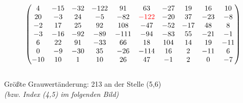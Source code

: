 \documentclass[aspectratio=169]{beamer}
\begin{document}
\begin{frame}
\begin{columns}
\begin{column}{0.6\textwidth}
\begin{alertblock}
\begin{tiny}
\begin{equation*}
\begin{pmatrix}
                   4 & -15 & -32 & -122 &   91 &   63 & -27 &  19 &  16 &  10 \\
                   20 &  -3 &  24 &   -5 &  -82 & \textcolor{red}{-122} & -20 &  37 & -23 &  -8 \\
                  -2 &  17 &  25 &   92 &  108 &  -47 & -52 & -17 &  48 &   8 \\
                  -3 & -16 & -92 &  -89 & -111 &  -94 & -83 &  55 & -21 &  -1 \\
                   6 &  22 &  91 &  -33 &   66 &   18 & 104 &  14 &  19 & -11 \\
                   0 &  -9 & -30 &   35 &  -26 & -114 &  16 &   2 & -11 &   6 \\
                 -10 &  10 &   1 &   10 &   26 &   47 &  -1 &   2 &   0 &  -7 \\
            \end{pmatrix}
        \end{equation*}
        \end{tiny}
    \end{alertblock}
    \end{column}
    \end{columns}
    \begin{alertblock}
        {Größte Grauwertänderung:}
        213 an der Stelle (5,6)\\ 
        \footnotesize\textit{(bzw. Index (4,5) im folgenden Bild)}
    \end{alertblock}
\end{frame}
\end{document}
